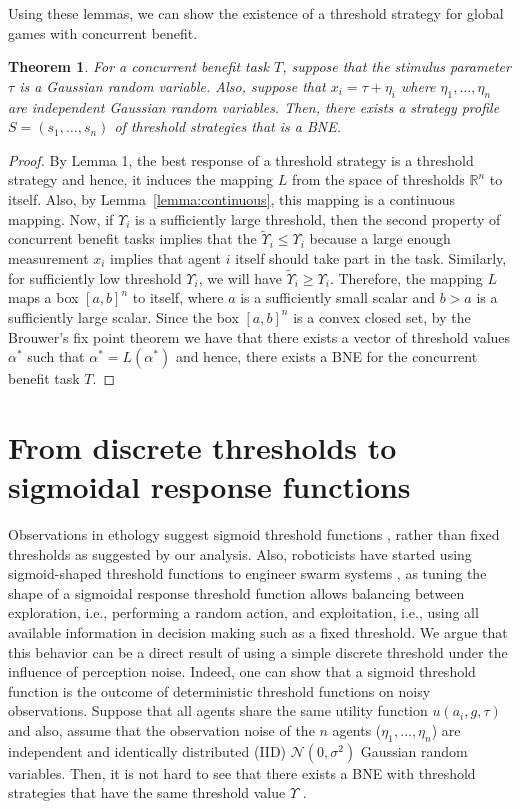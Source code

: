 \documentclass[defaultstyle,12pt]{thesis}
\newtheorem{theorem}{Theorem}
\newcommand{\R}{\mathbb{R}}    %
\newcommand{\td}{\Upsilon}   %
\begin{document}
Using these lemmas, we can show the existence of a threshold strategy for global games with concurrent benefit. 
\begin{theorem}\label{thrm:mainthrm}
For a concurrent benefit task $T$, suppose that the stimulus parameter $\tau$ is a Gaussian random variable. Also, suppose that $x_i=\tau+\eta_i$ where $\eta_1,\ldots,\eta_n$ are independent Gaussian random variables. Then, there exists a strategy profile $S=(s_1,\ldots,s_n)$ of threshold strategies that is a BNE.
\end{theorem}
\begin{proof}
By Lemma 1, the best response of a threshold strategy is a threshold strategy and hence, it induces the mapping $L$ from the space of thresholds $\R^n$ to itself. Also, by Lemma~\ref{lemma:continuous}, this mapping is a continuous mapping. Now, if $\td_i$ is a sufficiently large threshold, then the second property of concurrent benefit tasks implies that the $\tilde{\td}_i\leq \td_i$ because a large enough measurement $x_i$ implies that agent $i$ itself should take part in the task. Similarly, for sufficiently low threshold $\td_i$, we will have $\tilde{\td}_i\geq \td_i$. Therefore, the mapping $L$ maps a box $[a,b]^n$ to itself, where $a$ is a sufficiently small scalar and $b>a$ is a sufficiently large scalar. Since the box $[a,b]^n$ is a convex closed set, by the Brouwer's fix point theorem \cite{Border1990} we have that there exists a vector of threshold values $\alpha^*$ such that $\alpha^*=L(\alpha^*)$ and hence, there exists a BNE for the concurrent benefit task $T$.
\end{proof}

\section{From discrete thresholds to sigmoidal response functions}\label{sec:continuous}
Observations in ethology suggest sigmoid threshold functions \cite{Bonabeau1996}, rather than fixed thresholds as suggested by our analysis. Also, roboticists have started using sigmoid-shaped threshold functions to engineer swarm systems \cite{Bonabeau1996,Theraulaz1998,Krieger2000}, as tuning the shape of a sigmoidal response threshold function allows balancing between exploration, i.e., performing a random action, and exploitation, i.e., using all available information in decision making such as a fixed threshold. 
We argue that this behavior can be a direct result of using a simple discrete threshold under the influence of perception noise. Indeed, one can show that a sigmoid threshold function is the outcome of deterministic threshold functions on noisy observations. Suppose that all  agents share the same utility function $u(a_i,g,\tau)$ and also, assume that the observation noise of the $n$ agents ($\eta_1,\ldots,\eta_n$) are independent and identically distributed (IID) $\mathcal{N}(0,\sigma^2)$ Gaussian random variables. Then, it is not hard to see that there exists a BNE with threshold strategies that have the same threshold value $\td$ \cite{Morris2000}.
\end{document}
